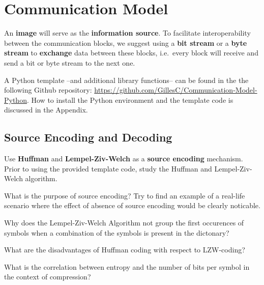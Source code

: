 \documentclass[12pt,a4paper]{article}
\begin{document}
\section{Communication Model}
An \textbf{image} will serve as the \textbf{information source}. 
To facilitate interoperability between the communication blocks, we suggest using a \textbf{bit stream} or a \textbf{byte stream} to \textbf{exchange} data between these blocks, i.e.\ every block will receive and send a bit or byte stream to the next one. %

A Python template --and additional library functions-- can be found in the the following Github repository: \url{https://github.com/GillesC/Communication-Model-Python}. How to install the Python environment and the template code is discussed in the Appendix.

\subsection{Source Encoding and Decoding}
Use \textbf{Huffman} and \textbf{Lempel-Ziv-Welch} as a \textbf{source encoding} mechanism. Prior to using the provided template code, study the Huffman and Lempel-Ziv-Welch algorithm. 


\begin{question}
	What is the purpose of source encoding? Try to find an example of a real-life scenario where the effect of absence of source encoding would be clearly noticable.
\end{question}

\begin{question}
	Why does the Lempel-Ziv-Welch Algorithm not group the first occurences of symbols when a combination of the symbols is present in the dictonary?
\end{question}

\begin{question}
	What are the disadvantages of Huffman coding with respect to LZW-coding?
\end{question}

\begin{question}
	What is the correlation between entropy and the number of bits per symbol in the context of compression? 
\end{question}
\end{document}
